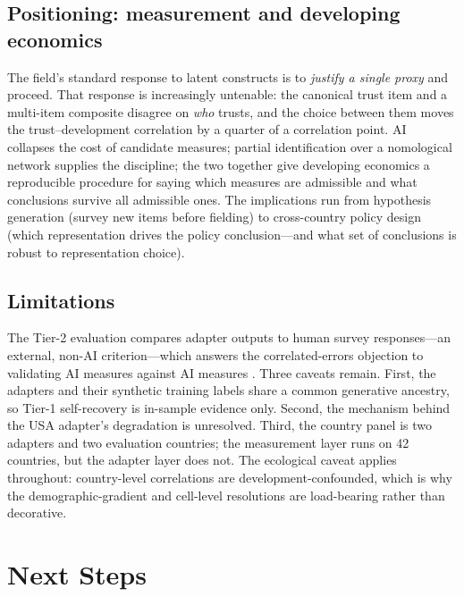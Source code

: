 \documentclass[11pt,letterpaper]{article}
\begin{document}
\subsection{Positioning: measurement and developing economics}

The field's standard response to latent constructs is to \emph{justify a single proxy} and proceed. That response is increasingly untenable: the canonical trust item and a multi-item composite disagree on \emph{who} trusts, and the choice between them moves the trust--development correlation by a quarter of a correlation point. AI collapses the cost of candidate measures; partial identification over a nomological network supplies the discipline; the two together give developing economics a reproducible procedure for saying which measures are admissible and what conclusions survive all admissible ones. The implications run from hypothesis generation (survey new items before fielding) to cross-country policy design (which representation drives the policy conclusion---and what set of conclusions is robust to representation choice).

\subsection{Limitations}

The Tier-2 evaluation compares adapter outputs to human survey responses---an external, non-AI criterion---which answers the correlated-errors objection to validating AI measures against AI measures \cite{dell2026}. Three caveats remain. First, the adapters and their synthetic training labels share a common generative ancestry, so Tier-1 self-recovery is in-sample evidence only. Second, the mechanism behind the USA adapter's degradation is unresolved. Third, the country panel is two adapters and two evaluation countries; the measurement layer runs on 42 countries, but the adapter layer does not. The ecological caveat applies throughout: country-level correlations are development-confounded, which is why the demographic-gradient and cell-level resolutions are load-bearing rather than decorative.

\section{Next Steps}
\end{document}
